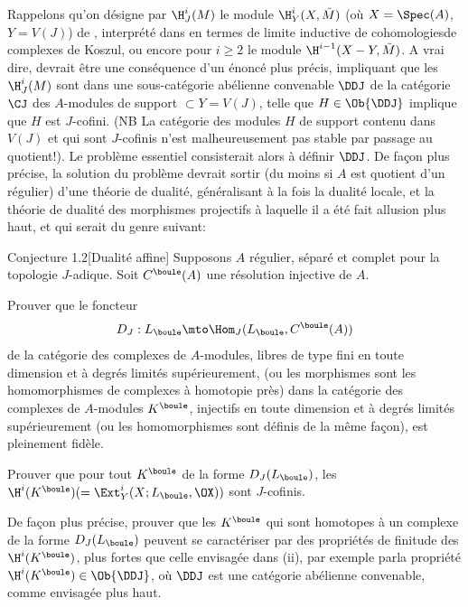 Rappelons qu'on d\'esigne par $\H^i_J (M)$ le module $\H^i_Y (X, \tilde{M})$ (o\`u $X=\Spec (A)$, $Y=V(J)$) de \Exp {}, interpr\'et\'e dans  en termes de limite inductive de cohomologies\pageoriginale de complexes de Koszul, ou encore pour $i\ge 2$ le module $\H^{i-1} (X-Y, \tilde{M})$. A vrai dire,  devrait \^etre une cons\'equence d'un \'enonc\'e plus pr\'ecis, impliquant que les $\H^i_J ({M})$ sont dans une sous-cat\'egorie ab\'elienne convenable ${\DDJ}$ de la cat\'egorie ${\CJ}$ des $A$-modules de support $\subset Y=V(J)$, telle que $H\in \Ob {\DDJ}$ implique que $H$ est $J$-cofini. (NB La cat\'egorie des modules $H$ de support contenu dans $V(J)$ et qui sont $J$-cofinis n'est malheureusement pas stable par passage au quotient!). Le probl\`eme essentiel consisterait alors \`a d\'efinir ${\DDJ}$. De fa\c con plus pr\'ecise, la solution du probl\`eme  devrait sortir (du moins si $A$ est quotient d'un r\'egulier) d'une th\'eorie de dualit\'e, g\'en\'eralisant \`a la fois la dualit\'e locale, et la th\'eorie de dualit\'e des morphismes projectifs \`a laquelle il a \'et\'e fait allusion plus haut, et qui serait du genre suivant:

 \label{XIII.1.2}
\begin{enonce*}{Conjecture 1.2}[\og Dualit\'e affine\fg\sfootnotemark]
 Supposons $A$ r\'egulier, s\'epar\'e et complet pour la topologie $J$-adique. Soit $C^{\boule}(A)$ une r\'esolution injective de $A$.
\begin{enumeratei}
\item
Prouver que le foncteur
$$D_J: L_{\boule}\mto \Hom_J(L_{\boule}, C^{\boule}(A))$$
de la cat\'egorie des complexes de $A$-modules, libres de type fini en toute dimension et \`a degr\'es limit\'es sup\'erieurement, (ou les morphismes sont les homomorphismes de complexes \`a homotopie pr\`es) dans la cat\'egorie des complexes de $A$-modules $K^{\boule}$, injectifs en toute dimension et \`a degr\'es limit\'es sup\'erieurement (ou les homomorphismes sont d\'efinis de la m\^eme fa\c con), est pleinement fid\`ele.

\item
Prouver que pour tout $K^{\boule}$ de la forme $D_J(L_{\boule})$, les $\H^i(K^{\boule})(= \Ext_Y^i (X; L_{\boule}, \OX))$ sont $J$-cofinis.

\item
De fa\c con plus pr\'ecise, prouver que les $K^{\boule}$ qui sont homotopes \`a un complexe de la forme $D_J(L_{\boule})$ peuvent se caract\'eriser par des propri\'et\'es de finitude des $\H^i(K^{\boule})$, plus fortes que celle envisag\'ee dans (ii), par exemple par\pageoriginale la propri\'et\'e $\H^i(K^{\boule})\in \Ob {\DDJ}$, o\`u ${\DDJ}$ est une cat\'egorie ab\'elienne convenable, comme envisag\'ee plus haut.
\end{enumeratei}
\end{enonce*}

